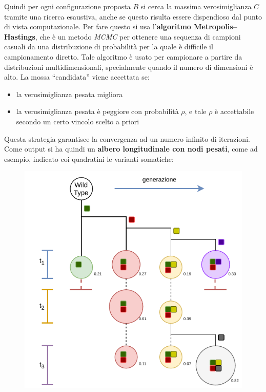 \documentclass[a4paper,12pt, oneside]{book}
\begin{document}
Quindi per ogni configurazione proposta $B$ si cerca la massima verosimiglianza
$C$ tramite una ricerca esaustiva, anche se questo risulta essere dispendioso
dal punto di vista computazionale. Per fare questo si usa l'\textbf{algoritmo
  Metropolis–Hastings}, che è un metodo \textit{MCMC} per ottenere una sequenza
di campioni casuali da una distribuzione di probabilità per la quale è difficile
il campionamento diretto. Tale algoritmo è usato per campionare a partire da
distribuzioni multidimensionali, specialmente quando il numero di dimensioni è
alto. La mossa ``candidata'' viene accettata se:
\begin{itemize}
  \item la verosimiglianza pesata migliora
  \item la verosimiglianza pesata è peggiore con probabilità $\rho$, e tale
  $\rho$ è accettabile secondo un certo vincolo scelto a priori
\end{itemize}
Questa strategia garantisce la convergenza ad un numero infinito di
iterazioni.\\
Come output si ha quindi un \textbf{albero longitudinale con nodi pesati}, come
ad esempio, indicato coi quadratini le varianti somatiche:
\begin{figure}[H]
  \centering
  \includegraphics[scale = 0.9]{img/lace3.pdf} 
\end{figure}
\end{document}
